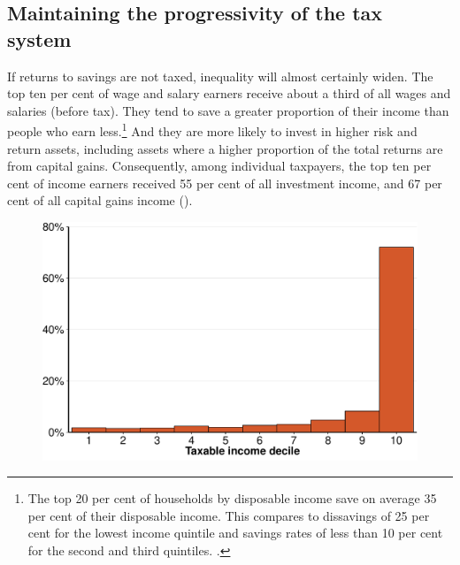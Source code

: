 \subsection{Maintaining the progressivity of the tax system}\label{subsec:maintaining-progressivity-tax-system}
If returns to savings are not taxed, inequality will almost certainly widen. The top ten per cent of wage and salary earners receive about a third of all wages and salaries (before tax). They tend to save a greater proportion of their income than people who earn less.\footnote{The top 20 per cent of households by disposable income save on average 35 per cent of their disposable income. This compares to dissavings of 25 per cent for the lowest income quintile and savings rates of less than 10 per cent for the second and third quintiles. \textcite[][table~5]{ABS2014DistributionHouseholdIncome}.} And they are more likely to invest in higher risk and return assets, including assets where a higher proportion of the total returns are from capital gains. Consequently, among individual taxpayers, the top ten per cent of income earners received 55 per cent of all investment income, and 67 per cent of all capital gains income (). 

\begin{figure}[!ht]
\label{fig:CG-by-decile}

\includegraphics[width=\columnwidth]{CGT-NG-atlas//CG-by-decile-1}
\end{figure}

